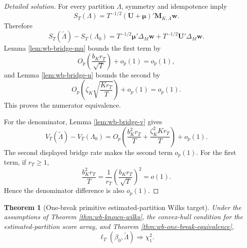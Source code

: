 \documentclass[12pt]{article}
\numberwithin{equation}{section}
\newtheorem{theorem}{Theorem}
\theoremstyle{definition}
\begin{document}
\begin{proof}[Detailed solution]
For every partition \(\Lambda\), symmetry and idempotence imply
\[
    S_T(\Lambda)
    =T^{-1/2}(\bm U+\bm\mu)'
       \bm M_{K,\Lambda}\bm w.
\]
Therefore
\[
    S_T(\widetilde\Lambda)-S_T(\Lambda_0)
    =T^{-1/2}\bm\mu'\Delta_M\bm w
      +T^{-1/2}\bm U'\Delta_M\bm w.
\]
Lemma \ref{lem:wb-bridge-mu} bounds the first term by
\[
    O_p\left(\frac{b_Kr_T}{\sqrt T}\right)+o_p(1)=o_p(1),
\]
and Lemma \ref{lem:wb-bridge-u} bounds the second by
\[
    O_p\left(\zeta_K\sqrt{\frac{Kr_T}{T}}\right)+o_p(1)=o_p(1).
\]
This proves the numerator equivalence.

For the denominator, Lemma \ref{lem:wb-bridge-v} gives
\[
    V_T(\widetilde\Lambda)-V_T(\Lambda_0)
    =O_p\left(
       \frac{b_K^2r_T}{T}+
       \frac{\zeta_K^2Kr_T}{T}
      \right)+o_p(1).
\]
The second displayed bridge rate makes the second term \(o_p(1)\).  For the
first term, if \(r_T\geq1\),
\[
    \frac{b_K^2r_T}{T}
    =\frac{1}{r_T}
      \left(\frac{b_Kr_T}{\sqrt T}\right)^2=o(1).
\]
Hence the denominator difference is also \(o_p(1)\).
\end{proof}


\begin{theorem}[One-break primitive estimated-partition Wilks target]
\label{thm:wb-one-break-wilks}
Under the assumptions of Theorem \ref{thm:wb-known-wilks}, the convex-hull condition for the estimated-partition score array, and Theorem \ref{thm:wb-one-break-equivalence},
\[
    \ell_T(\beta_0,\widetilde\Lambda)\Rightarrow\chi_1^2.
\]
\end{theorem}
\end{document}

